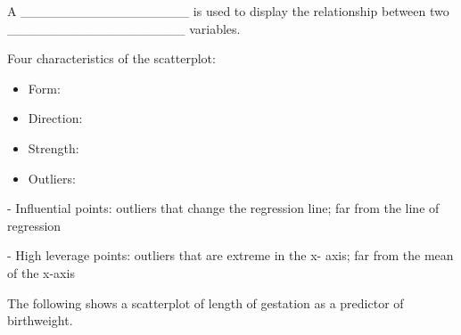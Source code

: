 \documentclass[
]{report}
\providecommand{\tightlist}{%
  \setlength{\itemsep}{0pt}\setlength{\parskip}{0pt}}
\newcommand{\rgi}{\hspace{24pt}}  %
\begin{document}
A \_\_\_\_\_\_\_\_\_\_\_\_\_\_\_\_\_\_ is used to display the relationship
between two \_\_\_\_\_\_\_\_\_\_\_\_\_\_\_\_\_\_\_ variables.

\newpage

Four characteristics of the scatterplot:

\begin{itemize}
\tightlist
\item
  Form:
\end{itemize}

\vspace{0.2in}

\begin{itemize}
\tightlist
\item
  Direction:
\end{itemize}

\vspace{0.2in}

\begin{itemize}
\tightlist
\item
  Strength:
\end{itemize}

\vspace{0.2in}

\begin{itemize}
\tightlist
\item
  Outliers:
\end{itemize}

\vspace{0.2in}

\rgi \rgi - Influential points: outliers that change the regression line; far from the line of regression

\rgi \rgi - High leverage points: outliers that are extreme in the x- axis; far from the mean of the x-axis

The following shows a scatterplot of length of gestation as a predictor of birthweight.
\end{document}
